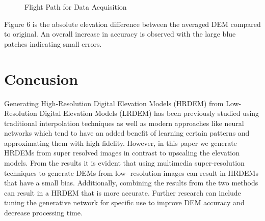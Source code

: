 \documentclass[conference]{IEEEtran}
\begin{document}
\begin{figure}[htbp]
    \caption{Flight Path for Data Acquisition}
    \label{fig4}
\end{figure}


Figure 6 is the absolute elevation difference between the averaged DEM
compared to original. An overall increase in accuracy is
observed with the large blue patches indicating small errors.

\section{Concusion}
Generating High-Resolution Digital Elevation Models
(HRDEM) from Low-Resolution Digital Elevation Models
(LRDEM) has been previously studied using traditional
interpolation techniques as well as modern approaches like
neural networks which tend to have an added benefit of
learning certain patterns and approximating them with high
fidelity. However, in this paper we generate HRDEMs from
super resolved images in contrast to upscaling the elevation
models. From the results it is evident that using multimedia
super-resolution techniques to generate DEMs from low-
resolution images can result in HRDEMs that have a small
bias. Additionally, combining the results from the two
methods can result in a HRDEM that is more accurate.
Further research can include tuning the generative network
for specific use to improve DEM accuracy and decrease
processing time.
\end{document}
